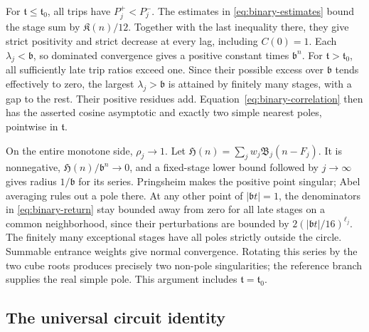 For \(\mathfrak t\le\mathfrak t_0\), all trips have \(P_j^+<P_j^-\). The estimates in \eqref{eq:binary-estimates} bound the stage sum by \(\mathfrak K(n)/12\). Together with the last inequality there, they give strict positivity and strict decrease at every lag, including \(C(0)=1\). Each \(\lambda_j<\mathfrak b\), so dominated convergence gives a positive constant times \(\mathfrak b^n\). For \(\mathfrak t>\mathfrak t_0\), all sufficiently late trip ratios exceed one. Since their possible excess over \(\mathfrak b\) tends effectively to zero, the largest \(\lambda_j>\mathfrak b\) is attained by finitely many stages, with a gap to the rest. Their positive residues add. Equation~\eqref{eq:binary-correlation} then has the asserted cosine asymptotic and exactly two simple nearest poles, pointwise in \(\mathfrak t\).

On the entire monotone side, \(\rho_j\to1\). Let \(\mathfrak H(n)=\sum_jw_j\mathfrak B_j(n-F_j)\). It is nonnegative, \(\mathfrak H(n)/\mathfrak b^n\to0\), and a fixed-stage lower bound followed by \(j\to\infty\) gives radius \(1/\mathfrak b\) for its series. Pringsheim makes the positive point singular; Abel averaging rules out a pole there. At any other point of \(|\mathfrak b t|=1\), the denominators in \eqref{eq:binary-return} stay bounded away from zero for all late stages on a common neighborhood, since their perturbations are bounded by \(2(|\mathfrak b t|/16)^{\ell_j}\). The finitely many exceptional stages have all poles strictly outside the circle. Summable entrance weights give normal convergence. Rotating this series by the two cube roots produces precisely two non-pole singularities; the reference branch supplies the real simple pole. This argument includes \(\mathfrak t=\mathfrak t_0\).

\subsection{The universal circuit identity}\label{sec:circuit-identity}

